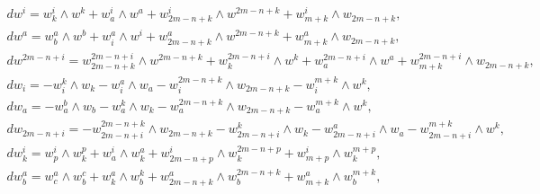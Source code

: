 \begin{equation}


\label{eq3}


\begin{array}{l}


dw^{i} =w^{i}_k\wedge w^{k}+w^{i}_{a}\wedge w^{a}+w^{i}_{2m-


n+k}\wedge w^{2m-n+k}+w^{i}_{m+k}\wedge w_{2m-n+k},\\


%


dw^{a}= w^{a}_b\wedge w^{b}+w^{a}_{i}\wedge w^{i}+w^{a}_{2m-


n+k}\wedge w^{2m-n+k}+w^{a}_{m+k}\wedge w_{2m-n+k},\\


%


dw^{2m-n+i} =w^{2m-n+i}_{2m-n+k} \wedge w^{2m-n+k}+w^{2m-


n+i}_{k}\wedge w^{k}+ w^{2m-n+i}_{a}\wedge w^{a} +w^{2m-n+i}_{m+k}\wedge


w_{2m-n+k},\\


%


dw_{i}=-w^{k}_i\wedge w_{k}-w^{a}_{i}\wedge w_{a}-w_{i}^{2m-


n+k}\wedge w_{2m-n+k}-w_{i}^{m+k}\wedge w^k,\\


%


dw_{a}=-w^{b}_a\wedge w_{b}-w^{k}_{a}\wedge w_{k}-w_{a}^{2m-


n+k}\wedge w_{2m-n+k}-w_{a}^{m+k}\wedge w^k,\\


%


dw_{2m-n+i}=-w^{2m-n+k}_{2m-n+i}\wedge w_{2m-n+k}-w^{k}_{2m-


n+i}\wedge w_{k}-w^{a}_{2m-n+i}\wedge w_{a}-w_{2m-n+i}^{m+k}\wedge w^k,\\


%


dw^{i}_k =w^{i}_p\wedge w^{p}_k+w^{i}_{a}\wedge


w^{a}_k+w^{i}_{2m-n+p}\wedge w^{2m-n+p}_k+w^{i}_{m+p}\wedge w^{m+p}_k,\\


%


dw^{a}_b=w^{a}_{c}\wedge w^{c}_{b}+w^{a}_{k}\wedge


w^{k}_{b}+w^{a}_{2m-n+k}\wedge w^{2m-n+k}_{b}+w^{a}_{m+k}\wedge


w^{m+k}_{b},\\



\end{array}
\end{equation}
